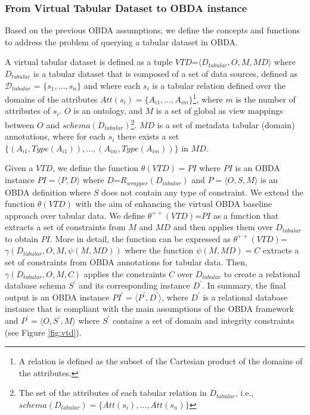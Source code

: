 \subsubsection{From Virtual Tabular Dataset to OBDA instance}
Based on the previous OBDA assumptions, we define the concepts and functions to address the problem of querying a tabular dataset in OBDA.
\begin{definition}
\label{def:vtd}
A virtual tabular dataset is defined as a tuple $VTD$=$\langle D_{tabular},O,M,MD\rangle$ where $D_{tabular}$ is a tabular dataset that is composed of a set of data sources, defined as $\mathcal{D}_{tabular}$ = $\{s_1,\ldots, s_n\}$ and where each $s_i$ is a tabular relation defined over the domains of the attributes $Att(s_i)=\{A_{i1},\ldots,A_{im}\}$\footnote{A relation is defined as the subset of the Cartesian product of the domains of the attributes.}, where $m$ is the number of attributes of $s_i$. $O$ is an ontology, and $M$ is a set of global as view mappings between $O$ and $schema(D_{tabular})$\footnote{The set of the attributes of each tabular relation in $D_{tabular}$, i.e., $schema(D_{tabular})=\{Att(s_i),\ldots,Att(s_n)\}$}. $MD$ is a set of metadata tabular (domain) annotations, where for each $s_i$ there exists a set $\{(A_{i1},Type(A_{i1})),\ldots,(A_{im},Type(A_{im}))\}$ in $MD$. 
\end{definition}

Given a $VTD$, we define the function $\theta(VTD)=PI$ where $PI$ is an OBDA instance $PI=\langle P,D\rangle$ where $D$=$R_{wrapper}(D_{tabular})$ and $P=\langle O,S,M\rangle$ is an OBDA definition where $S$ does not contain any type of constraint.
We extend the function $\theta(VTD)$ with the aim of enhancing the virtual OBDA baseline approach over tabular data. We define $\theta^{++}(VTD)$=$PI$ as a function that extracts a set of constraints from $M$ and $MD$ and then applies them over $D_{tabular}$ to obtain $PI$. More in detail, the function can be expressed as $\theta^{++}(VTD)$=$\gamma(D_{tabular},O,M,\psi(M,MD))$ where the function $\psi(M,MD)= C$ extracts a set of constraints from  OBDA annotations for tabular data. Then, $\gamma(D_{tabular},O,M,C)$ applies the constraints $C$ over $D_{tabular}$ to create a relational database schema $S^{'}$ and its corresponding instance $D^{'}$. In summary, the final output is an OBDA instance $PI^{'}=\langle P^{'},D^{'}\rangle$, where $D^{'}$ is a relational database instance that is compliant with the main assumptions of the OBDA framework and $P^{'}=\langle O,S^{'},M\rangle$ where $S^{'}$ contains a set of domain and integrity constraints (see Figure \ref{fig:vtd}). 

